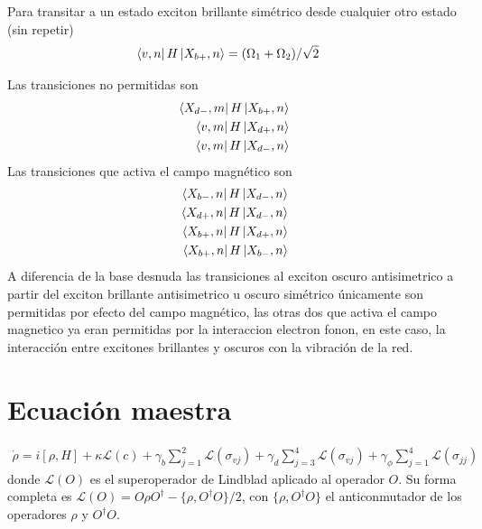\documentclass[main.tex]{subfiles}
\begin{document}
Para transitar a un estado exciton brillante simétrico desde cualquier otro estado (sin repetir)
\begin{align*}
    \bra{v,n} H \ket{X_{b+},n} &= (\Omega_1+\Omega_2)/\sqrt{2}
\end{align*}

Las transiciones no permitidas son
\begin{align*}
    \bra{X_{d-},m}H\ket{X_{b+},n}\\
    \bra{v,m}H\ket{X_{d+},n}\\
    \bra{v,m}H\ket{X_{d-},n}
\end{align*}
Las transiciones que activa el campo magnético son
\begin{align*}
    \bra{X_{b-},n} H \ket{X_{d-},n}\\
    \bra{X_{d+},n} H \ket{X_{d-},n}\\
    \bra{X_{b+},n} H \ket{X_{d+},n}\\
    \bra{X_{b+},n} H \ket{X_{b-},n}
\end{align*}
A diferencia de la base desnuda las transiciones al exciton oscuro antisimetrico a partir del exciton brillante antisimetrico u oscuro simétrico únicamente son permitidas por efecto del campo magnético, las otras dos que activa el campo magnetico ya eran permitidas por la interaccion electron fonon, en este caso, la interacción entre excitones brillantes y oscuros con la vibración de la red. 
\chapter{Ecuación maestra}
\begin{align}
    \dot{\rho} = i[\rho, H] + \kappa \mathcal{L}(c) + \gamma_b \sum_{j=1}^2 \mathcal{L}(\sigma_{vj}) + \gamma_d \sum_{j=3}^4 \mathcal{L}(\sigma_{vj}) + \gamma_\phi \sum_{j=1}^4 \mathcal{L}(\sigma_{jj})
\end{align}
donde $\mathcal{L}(O)$ es el superoperador de Lindblad  aplicado al operador $O$. Su forma completa es $\mathcal{L}(O) = O\rho O^\dagger - \{\rho, O^\dagger O\}/2$, con $\{\rho,O^\dagger O\}$ el anticonmutador de los operadores $\rho$ y $O^\dagger O$.
\end{document}
